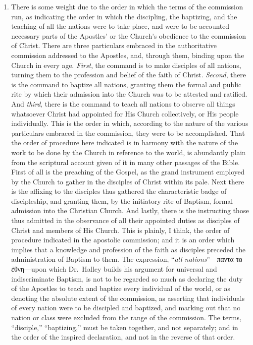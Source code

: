 \documentclass[
  english,
]{book}
\newcommand{\textgreek}[2][]{\foreignlanguage{greek}{#2}}
\begin{document}
\begin{enumerate}
\def\labelenumi{\arabic{enumi}.}
\item
  There is some weight due to the order in which the terms of the commission run, as indicating the order in which the discipling, the baptizing, and the teaching of all the nations were to take place, and were to be accounted necessary parts of the Apostles' or the Church's obedience to the commission of Christ. There are three particulars embraced in the authoritative commission addressed to the Apostles, and, through them, binding upon the Church in every age. \emph{First}, the command is to make disciples of all nations, turning them to the profession and belief of the faith of Christ. \emph{Second}, there is the command to baptize all nations, granting them the formal and public rite by which their admission into the Church was to be attested and ratified. And \emph{third}, there is the command to teach all nations to observe all things whatsoever Christ had appointed for His Church collectively, or His people individually. This is the order in which, according to the nature of the various particulars embraced in the commission, they were to be accomplished. That the order of procedure here indicated is in harmony with the nature of the work to be done by the Church in reference to the world, is abundantly plain from the scriptural account given of it in many other passages of the Bible. First of all is the preaching of the Gospel, as the grand instrument employed by the Church to gather in the disciples of Christ within its pale. Next there is the affixing to the disciples thus gathered the characteristic badge of discipleship, and granting them, by the initiatory rite of Baptism, formal admission into the Christian Church. And lastly, there is the instructing those thus admitted in the observance of all their appointed duties as disciples of Christ and members of His Church. This is plainly, I think, the order of procedure indicated in the apostolic commission; and it is an order which implies that a knowledge and profession of the faith as disciples preceded the administration of Baptism to them. The expression, ``\emph{all nations}''---\textgreek{παντα τα ἐθνη}---upon which Dr.~Halley builds his argument for universal and indiscriminate Baptism, is not to be regarded so much as declaring the duty of the Apostles to teach and baptize every individual of the world, or as denoting the absolute extent of the commission, as asserting that individuals of every nation were to be discipled and baptized, and marking out that no nation or class were excluded from the range of the commission. The terms, ``disciple,'' ``baptizing,'' must be taken together, and not separately; and in the order of the inspired declaration, and not in the reverse of that order.

\end{enumerate}
\end{document}
